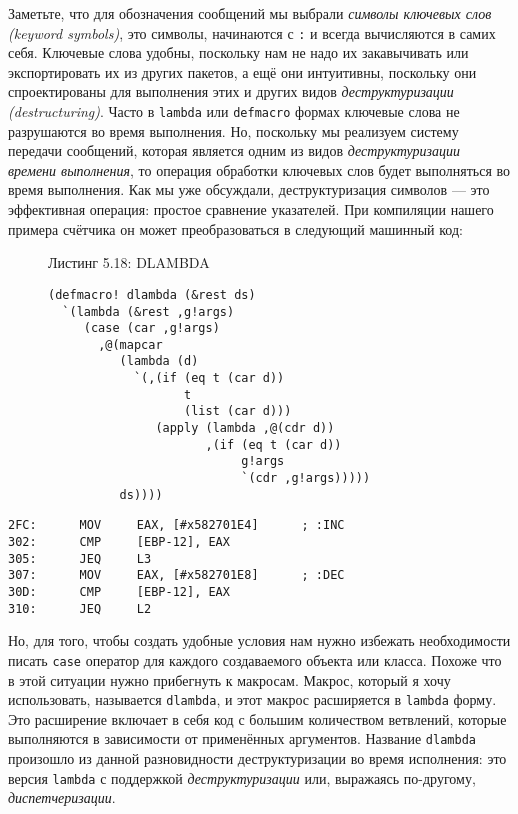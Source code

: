 Заметьте, что для обозначения сообщений мы выбрали \emph{символы ключевых слов (keyword symbols)}, это символы, начинаются с \verb":" и всегда вычисляются в самих себя. Ключевые слова удобны, поскольку нам не надо их закавычивать или экспортировать их из других пакетов, а ещё они интуитивны, поскольку они спроектированы для выполнения этих и других видов \emph{деструктуризации (destructuring)}. Часто в \verb"lambda" или \verb"defmacro" формах ключевые слова не разрушаются во время выполнения. Но, поскольку мы реализуем систему передачи сообщений, которая является одним из видов \emph{деструктуризации времени выполнения}, то операция обработки ключевых слов будет выполняться во время выполнения. Как мы уже обсуждали, деструктуризация символов --- это эффективная операция: простое сравнение указателей. При компиляции нашего примера счётчика он может преобразоваться в следующий машинный код:

\begin{figure}Листинг 5.18: DLAMBDA\label{listing_5.18}
\listbegin
\begin{verbatim}
(defmacro! dlambda (&rest ds)
  `(lambda (&rest ,g!args)
     (case (car ,g!args)
       ,@(mapcar
          (lambda (d)
            `(,(if (eq t (car d))
                   t
                   (list (car d)))
               (apply (lambda ,@(cdr d))
                      ,(if (eq t (car d))
                           g!args
                           `(cdr ,g!args)))))
          ds))))
\end{verbatim}
\listend
\end{figure}

\begin{verbatim}
2FC:      MOV     EAX, [#x582701E4]      ; :INC
302:      CMP     [EBP-12], EAX
305:      JEQ     L3
307:      MOV     EAX, [#x582701E8]      ; :DEC
30D:      CMP     [EBP-12], EAX
310:      JEQ     L2
\end{verbatim}

Но, для того, чтобы создать удобные условия нам нужно избежать необходимости писать \verb"case" оператор для каждого создаваемого объекта или класса. Похоже что в этой ситуации нужно прибегнуть к макросам. Макрос, который я хочу использовать, называется \verb"dlambda", и этот макрос расширяется в \verb"lambda" форму. Это расширение включает в себя код с большим количеством ветвлений, которые выполняются в зависимости от применённых аргументов. Название \verb"dlambda" произошло из данной разновидности деструктуризации во время исполнения: это версия \verb"lambda" с поддержкой \emph{деструктуризации} или, выражаясь по-другому, \emph{диспетчеризации}.

